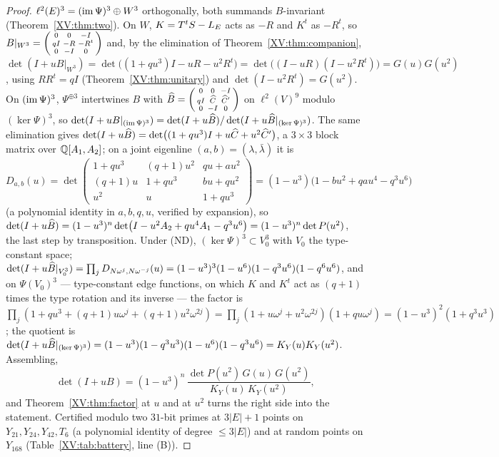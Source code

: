 \begin{proof}
$\ell^{2}(E)^{3}=(\operatorname{im}\Psi)^{3}\oplus W^{3}$ orthogonally, both summands $B$-invariant
(Theorem~\ref{XV:thm:two}). On $W$, $K=T^{t}S-L_E$ acts as $-R$ and $K^{t}$ as $-R^{t}$, so
$B|_{W^{3}}=\begin{psmallmatrix}0&0&-I\\qI&-R&-R^{t}\\0&-I&0\end{psmallmatrix}$ and, by the
elimination of Theorem~\ref{XV:thm:companion},
$\det(I+uB|_{W^{3}})=\det\bigl((1+qu^{3})I-uR-u^{2}R^{t}\bigr)=\det\bigl((I-uR)(I-u^{2}R^{t})\bigr)
=G(u)G(u^{2})$, using $RR^{t}=qI$ (Theorem~\ref{XV:thm:unitary}) and $\det(I-u^{2}R^{t})=G(u^{2})$.
On $(\operatorname{im}\Psi)^{3}$, $\Psi^{\oplus3}$ intertwines $B$ with
$\widehat B=\begin{psmallmatrix}0&0&-I\\qI&\widehat C&\widehat C{}'\\0&-I&0\end{psmallmatrix}$ on $\ell^{2}(V)^{9}$
modulo $(\ker\Psi)^{3}$, so $\det(I+uB|_{(\operatorname{im}\Psi)^{3}})=\det(I+u\widehat B)/\det(I+u\widehat B|_{(\ker\Psi)^{3}})$.
The same elimination gives $\det(I+u\widehat B)=\det\bigl((1+qu^{3})I+u\widehat C+u^{2}\widehat C{}'\bigr)$, a
$3\times3$ block matrix over $\mathbb{Q}[A_1,A_2]$; on a joint eigenline $(a,b)=(\lambda,\bar\lambda)$
it is
\[
D_{a,b}(u)=\det\begin{pmatrix}1+qu^{3}&(q{+}1)u^{2}&qu+au^{2}\\(q{+}1)u&1+qu^{3}&bu+qu^{2}\\u^{2}&u&1+qu^{3}\end{pmatrix}
=(1-u^{3})\bigl(1-bu^{2}+qau^{4}-q^{3}u^{6}\bigr)
\]
(a polynomial identity in $a,b,q,u$, verified by expansion), so
$\det(I+u\widehat B)=(1-u^{3})^{n}\det\bigl(I-u^{2}A_2+qu^{4}A_1-q^{3}u^{6}\bigr)=(1-u^{3})^{n}\det P(u^{2})$,
the last step by transposition. Under (ND), $(\ker\Psi)^{3}\subset V_0^{3}$ with
$V_0$ the type-constant space; $\det(I+u\widehat B|_{V_0^{3}})=\prod_jD_{N\omega^{j},N\omega^{-j}}(u)
=(1-u^{3})^{3}(1-u^{6})(1-q^{3}u^{6})(1-q^{6}u^{6})$, and on $\Psi(V_0)^{3}$ --- type-constant
edge functions, on which $K$ and $K^{t}$ act as $(q{+}1)$ times the type rotation and its
inverse --- the factor is $\prod_j(1+qu^{3}+(q{+}1)u\omega^{j}+(q{+}1)u^{2}\omega^{2j})
=\prod_j(1+u\omega^{j}+u^{2}\omega^{2j})(1+qu\omega^{j})=(1-u^{3})^{2}(1+q^{3}u^{3})$; the quotient is
$\det(I+u\widehat B|_{(\ker\Psi)^{3}})=(1-u^{3})(1-q^{3}u^{3})(1-u^{6})(1-q^{3}u^{6})=K_Y(u)K_Y(u^{2})$.
Assembling,
\[
\det(I+uB)=(1-u^{3})^{n}\,\frac{\det P(u^{2})\,G(u)\,G(u^{2})}{K_Y(u)\,K_Y(u^{2})},
\]
and Theorem~\ref{XV:thm:factor} at $u$ and at $u^{2}$ turns the right side into the statement.
Certified modulo two $31$-bit primes at $3|E|+1$ points on $Y_{21},Y_{24},Y_{42},T_6$ (a
polynomial identity of degree $\le3|E|$) and at random points on $Y_{168}$
(Table~\ref{XV:tab:battery}, line (B)).
\end{proof}

